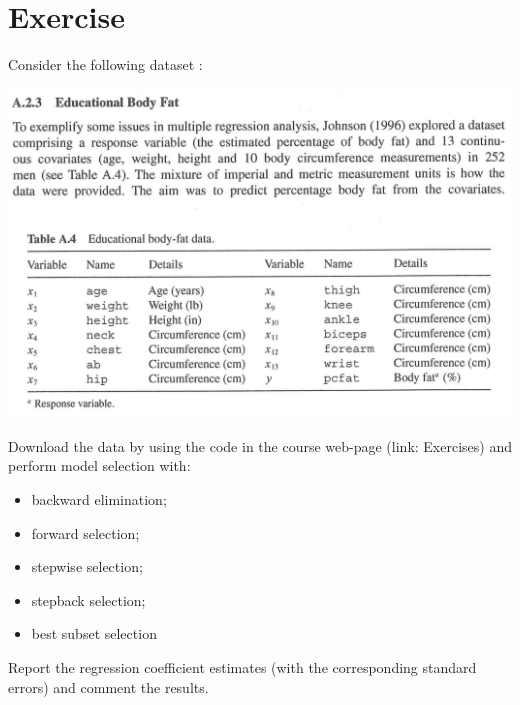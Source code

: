\documentclass[12pt,a4paper]{article}
\begin{document}
\section*{Exercise}
Consider the following dataset \citep{RoystonSauerbrei2008}:

\includegraphics{EBF_description}

\noindent Download the data by using the code in the course web-page (link: Exercises) and perform model selection with:
\begin{itemize}
\item backward elimination;
\item forward selection;
\item stepwise selection;
\item stepback selection;
\item best subset selection
\end{itemize}
Report the regression coefficient estimates (with the corresponding standard errors) and comment the results.



\end{document}
